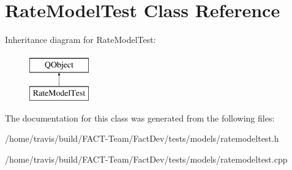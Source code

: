 \hypertarget{classRateModelTest}{\section{Rate\-Model\-Test Class Reference}
\label{classRateModelTest}
}
Inheritance diagram for Rate\-Model\-Test\-:\begin{figure}[H]
\begin{center}
\leavevmode
\includegraphics[height=2.000000cm]{d2/dcd/classRateModelTest}
\end{center}
\end{figure}


The documentation for this class was generated from the following files\-:\begin{DoxyCompactItemize}
\item 
/home/travis/build/\-F\-A\-C\-T-\/\-Team/\-Fact\-Dev/tests/models/ratemodeltest.\-h\item 
/home/travis/build/\-F\-A\-C\-T-\/\-Team/\-Fact\-Dev/tests/models/ratemodeltest.\-cpp\end{DoxyCompactItemize}
